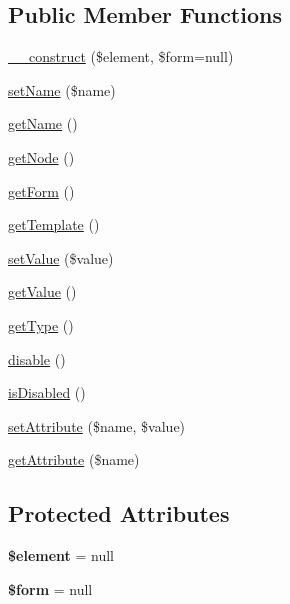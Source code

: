 \subsection*{Public Member Functions}
\begin{DoxyCompactItemize}
\item 
\hyperlink{classDom_1_1Form_1_1Element_a6ce880f508b05dd51b3da8f3e937ddf3}{\+\_\+\+\_\+construct} (\$element, \$form=null)
\item 
\hyperlink{classDom_1_1Form_1_1Element_ad6d9a61adec54cd4a0bc69b3438e8966}{set\+Name} (\$name)
\item 
\hyperlink{classDom_1_1Form_1_1Element_a73197b37d60104c2e35175b640d8c613}{get\+Name} ()
\item 
\hyperlink{classDom_1_1Form_1_1Element_a8ba319f18889a8629310065e974fc5cf}{get\+Node} ()
\item 
\hyperlink{classDom_1_1Form_1_1Element_aaa324956a3c1cc1c761018e2c7059b3b}{get\+Form} ()
\item 
\hyperlink{classDom_1_1Form_1_1Element_a5289f3b8137d9a6087ee7928bfcdcb13}{get\+Template} ()
\item 
\hyperlink{classDom_1_1Form_1_1Element_a9300ff63136238f244b2958b26b15543}{set\+Value} (\$value)
\item 
\hyperlink{classDom_1_1Form_1_1Element_a4dd060542b12b221c271be189a980536}{get\+Value} ()
\item 
\hyperlink{classDom_1_1Form_1_1Element_a63a05da078033cbfc7611b94107846c9}{get\+Type} ()
\item 
\hyperlink{classDom_1_1Form_1_1Element_a076eec1fb3cb9c6de75b8a542c3f0dcf}{disable} ()
\item 
\hyperlink{classDom_1_1Form_1_1Element_af99cd3a7e84f213b1e13f1dae4cfc1ed}{is\+Disabled} ()
\item 
\hyperlink{classDom_1_1Form_1_1Element_a514767ace45bc92f87b3927f3e4c7b26}{set\+Attribute} (\$name, \$value)
\item 
\hyperlink{classDom_1_1Form_1_1Element_ab9324099548b3f7d8e01ca4b78a7bf64}{get\+Attribute} (\$name)
\end{DoxyCompactItemize}
\subsection*{Protected Attributes}
\begin{DoxyCompactItemize}
\item 
\hypertarget{classDom_1_1Form_1_1Element_acc47d5447322fab467bfa067f5c70c2f}{{\bfseries \$element} = null}\label{classDom_1_1Form_1_1Element_acc47d5447322fab467bfa067f5c70c2f}

\item 
\hypertarget{classDom_1_1Form_1_1Element_ab3fca493114eb9e8de9b2e926451bb63}{{\bfseries \$form} = null}\label{classDom_1_1Form_1_1Element_ab3fca493114eb9e8de9b2e926451bb63}

\end{DoxyCompactItemize}


